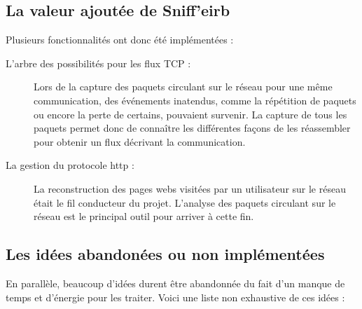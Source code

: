 \subsection{La valeur ajoutée de Sniff'eirb}
Plusieurs fonctionnalités ont donc été implémentées :
\begin{description}
\item[L'arbre des possibilités pour les flux TCP :] Lors de la capture des paquets circulant sur le réseau pour une même communication, des événements inatendus, comme la répétition de paquets ou encore la perte de certains,  pouvaient survenir. La capture de tous les paquets permet donc de connaître les différentes façons de les réassembler pour obtenir un flux décrivant la communication. 
\item[La gestion du protocole http :] La reconstruction des pages webs visitées par un utilisateur sur le réseau était le fil conducteur du projet. L'analyse des paquets circulant sur le réseau est le principal outil pour arriver à cette fin.
\end{description}

\subsection{Les idées abandonées ou non implémentées}
En parallèle, beaucoup d'idées durent être abandonnée du fait d'un manque de temps et d'énergie pour les traiter. Voici une liste non exhaustive de ces idées :
\begin{description}
\end{description}
